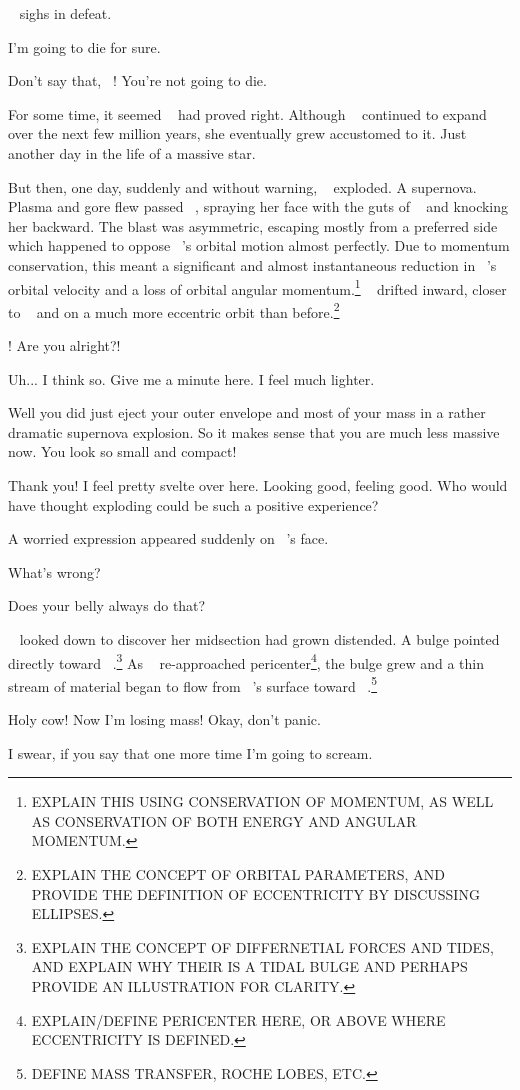 \documentclass[main.tex]{subfiles}
\begin{document}
\newpara \nar \rmmerope~ sighs in defeat.

\newpara \Merope I'm going to die for sure.

\newpara \Maia Don't say that, \rmmerope~!  You're not going to die.

\newpara \nar For some time, it seemed \rmmaia~ had proved right.  Although \rmmerope~ continued to expand over the next few million years, she eventually grew accustomed to it.  Just another day in the life of a massive star.

\newpara \nar But then, one day, suddenly and without warning, \rmmerope~ exploded.  A supernova.  Plasma and gore flew passed \rmmaia~, spraying her face with the guts of \rmmerope~ and knocking her backward.  The blast was asymmetric, escaping mostly from a preferred side which happened to oppose \rmmerope~'s orbital motion almost perfectly.  Due to momentum conservation, this meant a significant and almost instantaneous reduction in \rmmerope~'s orbital velocity and a loss of orbital angular momentum.\footnote{EXPLAIN THIS USING CONSERVATION OF MOMENTUM, AS WELL AS CONSERVATION OF BOTH ENERGY AND ANGULAR MOMENTUM.}  \rmmerope~ drifted inward, closer to \rmmaia~ and on a much more eccentric orbit than before.\footnote{EXPLAIN THE CONCEPT OF ORBITAL PARAMETERS, AND PROVIDE THE DEFINITION OF ECCENTRICITY BY DISCUSSING ELLIPSES.}  

\newpara \Maia \rmmerope! Are you alright?!  

\newpara \Merope Uh... I think so.  Give me a minute here.  I feel much lighter.

\newpara \Maia Well you did just eject your outer envelope and most of your mass in a rather dramatic supernova explosion.  So it makes sense that you are much less massive now.  You look so small and compact!  

\newpara \Merope Thank you!  I feel pretty svelte over here.  Looking good, feeling good.  Who would have thought exploding could be such a positive experience?

\newpara \nar A worried expression appeared suddenly on \rmmerope~'s face.

\newpara \Maia What's wrong?

\newpara \Merope Does your belly always do that?

\newpara \nar \rmmaia~ looked down to discover her midsection had grown distended.  A bulge pointed directly toward \rmmerope~.\footnote{EXPLAIN THE CONCEPT OF DIFFERNETIAL FORCES AND TIDES, AND EXPLAIN WHY THEIR IS A TIDAL BULGE AND PERHAPS PROVIDE AN ILLUSTRATION FOR CLARITY.}  As \rmmerope~ re-approached pericenter\footnote{EXPLAIN/DEFINE PERICENTER HERE, OR ABOVE WHERE ECCENTRICITY IS DEFINED.}, the bulge grew and a thin stream of material began to flow from \rmmaia~'s surface toward \rmmerope~.\footnote{DEFINE MASS TRANSFER, ROCHE LOBES, ETC.}

\newpara \Maia Holy cow!  Now I'm losing mass! Okay, don't panic.

\newpara \Merope I swear, if you say that one more time I'm going to scream.
\end{document}

